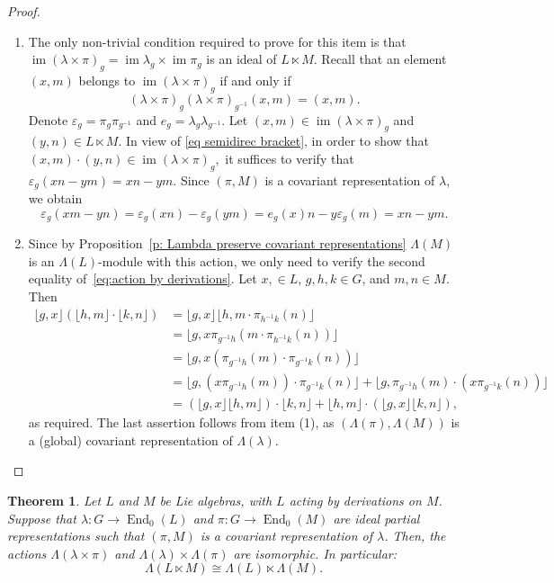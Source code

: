 \documentclass[11pt]{amsart}
\numberwithin{equation}{section}
\newtheorem{theorem}{Theorem}[section] %
\theoremstyle{definition}
\theoremstyle{remark}
\newcommand*{\im}{\operatorname{im}} %
\begin{document}
\begin{proof}\,

    \begin{enumerate}[(1)]
        \item The only non-trivial condition required to prove  for this item is  that \(\im (\lambda \times \pi)_g=\im\lambda_g\times \im\pi_g\)  is an ideal of $L\ltimes M$. Recall that an element $(x,m)$ belongs to $\im(\lambda\times \pi)_g$ if and only if $$(\lambda\times \pi)_g(\lambda\times \pi)_{g^{-1}}(x,m)=(x,m).$$ Denote $\varepsilon_g=\pi_g\pi_{g^{-1}}$ and $e_g=\lambda_g\lambda_{g^{-1}}$. Let $(x,m)\in \im(\lambda\times \pi)_g$ and $(y,n)\in L\ltimes M$.  In view of \eqref{eq semidirec bracket}, in order to show that $(x,m)\cdot(y,n) \in \im(\lambda\times \pi)_g,$
         it suffices to verify that $\varepsilon_g(xn-ym)=xn-ym$. Since $(\pi,M)$ is a covariant representation of $\lambda$, we obtain 
            $$\varepsilon_g(xm-yn)=\varepsilon_g(xn)-\varepsilon_g(ym)=
            e_g (x) n-y\varepsilon_g (m)= xn-ym.$$
        \item Since  by Proposition~\ref{p: Lambda preserve covariant representations}  $\Lambda(M)$ is an $\Lambda(L)$-module with this action,  we only need to verify the second equality of~\eqref{eq:action by derivations}. Let $x,\in L$, $g, h, k \in G$, and $m,n \in M$. Then
            \begin{align*}
                \lfloor g, x \rfloor (\lfloor h, m \rfloor\cdot \lfloor k, n \rfloor)&= \lfloor g, x \rfloor \lfloor h, m \cdot \pi_{h^{-1}k}(n) \rfloor\\ & = \lfloor g, x \pi_{g^{-1}h}(m \cdot \pi_{h^{-1}k}(n))\rfloor \\ &=\lfloor g, x (\pi_{g^{-1}h}(m) \cdot  \pi_{g^{-1}k}(n))\rfloor \\&=  \lfloor g, (x \pi_{g^{-1}h}(m)) \cdot  \pi_{g^{-1}k}(n)\rfloor + \lfloor g, \pi_{g^{-1}h}(m) \cdot  (x\pi_{g^{-1}k}(n))\rfloor \\&= (\lfloor g, x \rfloor \lfloor h, m \rfloor)\cdot \lfloor k, n \rfloor + \lfloor h, m \rfloor\cdot (\lfloor g, x \rfloor \lfloor k, n \rfloor),
            \end{align*}
            as required. The last assertion follows from item (1), as $(\Lambda(\pi), \Lambda(M))$ is a (global) covariant representation of $\Lambda(\lambda)$.
    \end{enumerate}
\end{proof}


\begin{theorem}
    Let $L$ and $M$ be Lie algebras, with $L$ acting by derivations on $M$. Suppose that \(\lambda: G \to \operatorname{End}_0(L)\) and $\pi: G\to \operatorname{End}_0(M)$ are  ideal  partial representations  such that  \((\pi, M)\) is a covariant representation of \(\lambda\). Then, the actions $\Lambda(\lambda\times \pi)$ and $\Lambda(\lambda)\times \Lambda(\pi)$ are isomorphic.
    In particular: 
    \[
       \Lambda(L\ltimes M)\cong \Lambda(L)\ltimes\Lambda(M).
    \]
\end{theorem}
\end{document}
